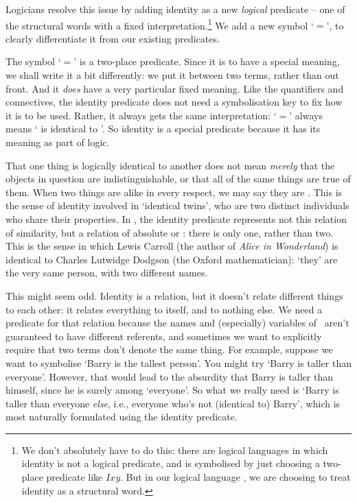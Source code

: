 Logicians resolve this issue by adding identity as a new \emph{logical} predicate – one of the structural words with a fixed interpretation.\footnote{We don't absolutely have to do this: there are logical languages in which identity is not a logical predicate, and is symbolised by just choosing a two-place predicate like $Ixy$. But in our logical language \FOL, we are choosing to treat identity as a structural word.} We add a new symbol `$=$', to clearly differentiate it from our existing predicates. 

The symbol `$=$' is a two-place predicate. Since it is to have a special meaning, we shall write it a bit differently: we put it between two terms, rather than out front. And it \emph{does} have a very particular fixed meaning. Like the quantifiers and connectives, the identity predicate does not need a symbolisation key to fix how it is to be used. Rather, it always gets the same interpretation: `$=$' always means ` is identical to '. So identity is a special predicate because it has its meaning as part of logic.

That one thing is logically identical to another does not mean \emph{merely} that the objects in question are indistinguishable, or that all of the same things are true of them. When two things are alike in every respect, we may say they are . This is the sense of identity involved in `identical twins', who are two distinct individuals who share their properties. In \FOL, the identity predicate represents not this relation of similarity, but a relation of absolute or : there is only one, rather than two. This is the sense in which Lewis Carroll (the author of \emph{Alice in Wonderland}) is identical to Charles Lutwidge Dodgson (the Oxford mathematician): `they' are the very same person, with two different names.

This might seem odd. Identity is a relation, but it doesn't relate different things to each other: it relates everything to itself, and to nothing else. We need a predicate for that relation because the names and (especially) variables of \FOL\ aren't guaranteed to have different referents, and sometimes we want to explicitly require that two terms don't denote the same thing. For example, suppose we want to symbolise `Barry is the tallest person'. You might try `Barry is taller than everyone'. However, that would lead to the absurdity that Barry is taller than himself, since he is surely among `everyone'. So what we really need is `Barry is taller than everyone \emph{else}, i.e., everyone who's not (identical to) Barry', which is most naturally formulated using the identity predicate.



